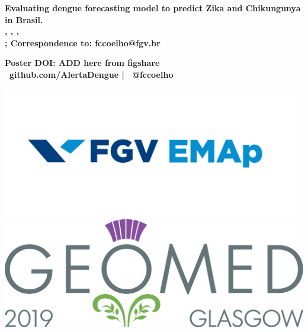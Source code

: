 \documentclass[a0,portrait]{a0poster}
\begin{document}


\begin{minipage}[b]{0.75\linewidth}
\VeryHuge \color{NavyBlue} \textbf{Evaluating dengue forecasting model to predict Zika and Chikungunya in Brasil.}
\color{Black}\\[0.4cm] 
\Large \textbf{
, 
, 
, 
} 
\\
\vspace{1cm}
\large \textbf{
; 
\large \textbf{Correspondence to: fccoelho@fgv.br}}
\begin{center}
    \large \textbf{Poster DOI: ADD here from figshare \\ \faGithub \ 
github.com/AlertaDengue | \faTwitter \ @fccoelho}
\end{center}
\end{minipage}
%
\begin{minipage}[b]{0.25\linewidth}
\begin{center}
\includegraphics[width=15cm]{figures/Marca_FGV_EMAp.png}\\ 
\includegraphics[width=16cm]{figures/geomed.png}\\
\end{center}
\end{minipage}
\end{document}
